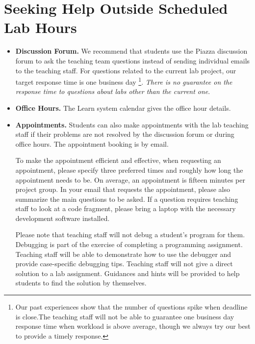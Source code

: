 \section*{Seeking Help Outside Scheduled Lab Hours}
\begin{itemize}
    \item{\bf Discussion Forum.}
      We recommend that students use the Piazza discussion forum to ask the teaching team questions instead of sending individual emails to the teaching staff.
      For questions related to the current lab project, our target response time is one business day
      \footnote{Our past experiences show that the number of questions spike when deadline is close.The teaching staff will not be able to guarantee one business day response time when workload is above average, though we always try our best to provide a timely response.}. 
    {\em There is no guarantee on the response time to questions about labs other than the current one}.
    \item{\bf Office Hours.} 
    The Learn system calendar gives the office hour details.
    \item{\bf Appointments.}
    Students can also make appointments with the lab teaching staff if their problems are not resolved by the discussion forum or during office hours. The appointment booking is by email.
    
    To make the appointment efficient and effective, when requesting an appointment, 
    please specify three preferred times and roughly how long 
    the appointment needs to be. On average, an appointment is fifteen minutes per project group. 
    In your email that requests the appointment, please also summarize the main questions to be asked.
    If a question requires teaching staff to look at a code fragment, please bring a laptop with the necessary development software installed. 
    
    Please note that teaching staff will not debug a student's program for them. Debugging is part of the exercise of completing a programming assignment. Teaching staff will be able to demonstrate how to use the debugger and provide case-specific debugging tips. Teaching staff will not give a direct solution to a lab assignment. Guidances and hints will be provided to help students to find the solution by themselves.
    
\end{itemize}

